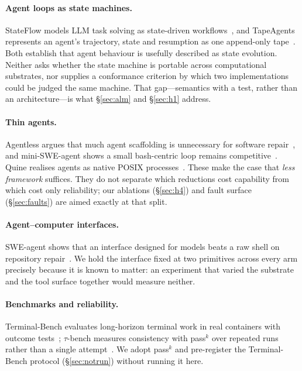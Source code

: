 \documentclass[11pt,a4paper]{article}
\begin{document}
\paragraph{Agent loops as state machines.}
StateFlow models LLM task solving as state-driven workflows~\cite{wu2024stateflow},
and TapeAgents represents an agent's trajectory, state and resumption as one
append-only tape~\cite{bahdanau2024tapeagents}. Both establish that agent
behaviour is usefully described as state evolution. Neither asks whether the
state machine is portable across computational substrates, nor supplies a
conformance criterion by which two implementations could be judged the same
machine. That gap---semantics with a test, rather than an architecture---is
what \S\ref{sec:alm} and \S\ref{sec:h1} address.

\paragraph{Thin agents.}
Agentless argues that much agent scaffolding is unnecessary for software
repair~\cite{xia2024agentless}, and mini-SWE-agent shows a small bash-centric
loop remains competitive~\cite{minisweagent}. Quine realises agents as native
POSIX processes~\cite{quine2026}. These make the case that \emph{less
framework} suffices. They do not separate which reductions cost capability from
which cost only reliability; our ablations (\S\ref{sec:h4}) and fault surface
(\S\ref{sec:faults}) are aimed exactly at that split.

\paragraph{Agent--computer interfaces.}
SWE-agent shows that an interface designed for models beats a raw shell on
repository repair~\cite{yang2024sweagent,jimenez2024swebench}. We hold the
interface fixed at two primitives across every arm precisely because it is
known to matter: an experiment that varied the substrate and the tool surface
together would measure neither.

\paragraph{Benchmarks and reliability.}
Terminal-Bench evaluates long-horizon terminal work in real containers with
outcome tests~\cite{merrill2026terminalbench}; $\tau$-bench measures consistency
with pass$^k$ over repeated runs rather than a single
attempt~\cite{yao2024taubench}. We adopt pass$^k$ and pre-register the
Terminal-Bench protocol (\S\ref{sec:notrun}) without running it here.
\end{document}
